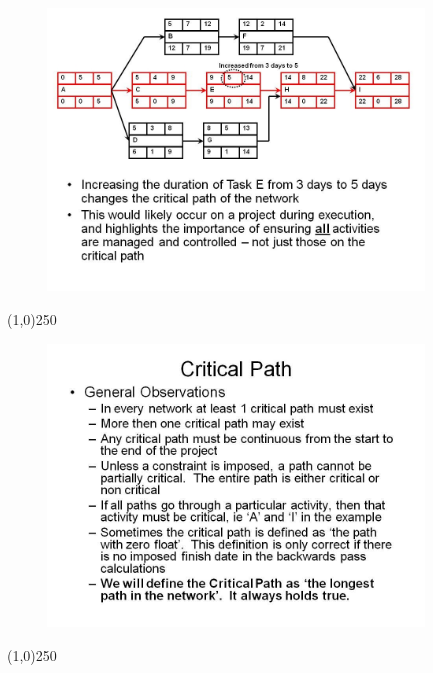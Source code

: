 \begin{frame}
\begin{figure}
	\centering
		\includegraphics[width = 10.0cm]{oldnotes/Slide170.jpg}
\end{figure}
\end{frame}
\begin{center}\line(1,0){250}\end{center}




\begin{frame}
\begin{figure}
	\centering
		\includegraphics[width = 10.0cm]{oldnotes/Slide171.jpg}
\end{figure}
\end{frame}
\begin{center}\line(1,0){250}\end{center}




